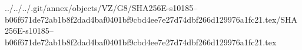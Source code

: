 ../../../.git/annex/objects/VZ/G8/SHA256E-s10185--b06f671de72ab1b8f2dad4baf0401bf9cbd4ee7e27d74dbf266d129976a1fc21.tex/SHA256E-s10185--b06f671de72ab1b8f2dad4baf0401bf9cbd4ee7e27d74dbf266d129976a1fc21.tex